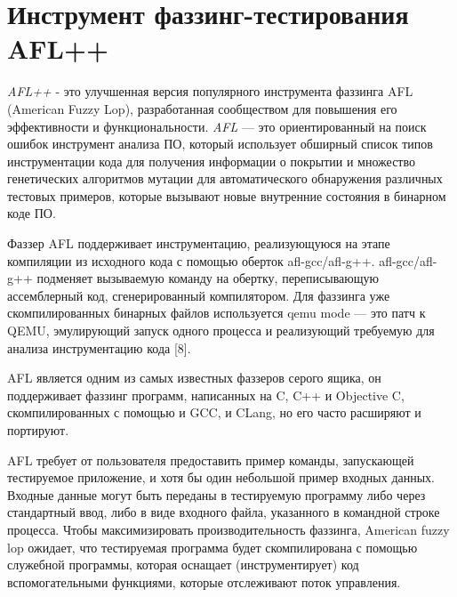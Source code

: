 \chapter{Инструмент фаззинг-тестирования AFL++} \label{ch3}


\textit{AFL++} - это улучшенная версия популярного инструмента фаззинга AFL (American Fuzzy Lop), разработанная сообществом для повышения его эффективности и функциональности. \textit{AFL} — это ориентированный на поиск ошибок инструмент анализа ПО, который использует обширный список типов инструментации кода для получения информации о покрытии и множество генетических алгоритмов мутации для автоматического обнаружения различных тестовых примеров, которые вызывают новые внутренние состояния в бинарном коде ПО.

 Фаззер AFL поддерживает инструментацию, реализующуюся на этапе компиляции из исходного кода с помощью оберток afl-gcc/afl-g++. afl-gcc/afl-g++ подменяет вызываемую команду на обертку, переписывающую ассемблерный код, сгенерированный компилятором. Для фаззинга уже скомпилированных бинарных файлов используется qemu mode — это патч к QEMU, эмулирующий запуск одного процесса и реализующий требуемую для анализа инструментацию кода [8].
\par
AFL является одним из самых известных фаззеров серого ящика, он поддерживает фаззинг программ, написанных на C, C++ и Objective C, скомпилированных с помощью и GCC, и CLang, но его часто расширяют и портируют.
\par
AFL требует от пользователя предоставить пример команды, запускающей тестируемое приложение, и хотя бы один небольшой пример входных данных. Входные данные могут быть переданы в тестируемую программу либо через стандартный ввод, либо в виде входного файла, указанного в командной строке процесса. Чтобы максимизировать производительность фаззинга, American fuzzy lop ожидает, что тестируемая программа будет скомпилирована с помощью служебной программы, которая оснащает (инструментирует) код вспомогательными функциями, которые отслеживают поток управления.


